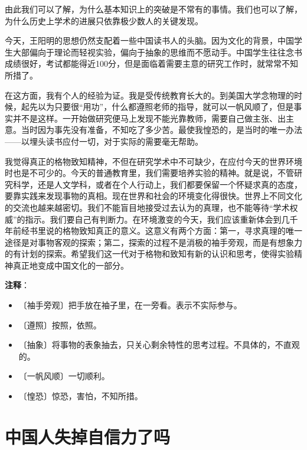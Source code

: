 \documentclass[12pt,UTF-8,openany]{ctexbook}
\begin{document}
\begin{large}
    由此我们可以了解，为什么基本知识上的突破是不常有的事情。我们也可以了解，为什么历史上学术的进展只依靠极少数人的关键发现。
    
    今天，王阳明的思想仍然支配着一些中国读书人的头脑。因为文化的背景，中国学生大部偏向于理论而轻视实验，偏向于抽象的思维而不愿动手。中国学生往往念书成绩很好，考试都能得近100分，但是面临着需要主意的研究工作时，就常常不知所措了。
    
    在这方面，我有个人的经验为证。我是受传统教育长大的。到美国大学念物理的时候，起先以为只要很“用功”，什么都遵照老师的指导，就可以一帆风顺了，但是事实并不是这样。一开始做研究便马上发现不能光靠教师，需要自己做主张、出主意。当时因为事先没有准备，不知吃了多少苦。最使我惶恐的，是当时的唯一办法——以埋头读书应付一切，对于实际的需要毫无帮助。
    
    我觉得真正的格物致知精神，不但在研究学术中不可缺少，在应付今天的世界环境时也是不可少的。今天的普通教育里，我们需要培养实验的精神。就是说，不管研究科学，还是人文学科，或者在个人行动上，我们都要保留一个怀疑求真的态度，要靠实践来发现事物的真相。现在世界和社会的环境变化得很快。世界上不同文化的交流也越来越密切。我们不能盲目地接受过去认为的真理，也不能等待“学术权威”的指示。我们要自己有判断力。在环境激变的今天，我们应该重新体会到几千年前经书里说的格物致知真正的意义。这意义有两个方面：第一，寻求真理的唯一途径是对事物客观的探索；第二，探索的过程不是消极的袖手旁观，而是有想象力的有计划的探索。希望我们这一代对于格物和致知有新的认识和思考，使得实验精神真正地变成中国文化的一部分。
    
\end{large}


\newpage

\textbf{注释}：

\vspace{-1em}

\begin{itemize}
    \setlength\itemsep{-0.2em}
    \item 〔袖手旁观〕把手放在袖子里，在一旁看。表示不实际参与。
    \item 〔遵照〕按照，依照。
    \item 〔抽象〕将事物的表象抽去，只关心剩余特性的思考过程。不具体的，不直观的。
    \item 〔一帆风顺〕一切顺利。
    \item 〔惶恐〕惊恐，害怕，不知所措。
\end{itemize}

\chapter{中国人失掉自信力了吗}
\end{document}
